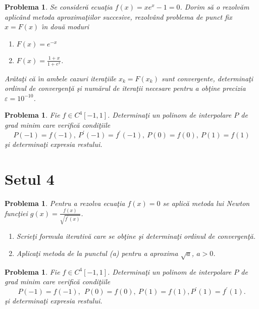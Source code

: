 \documentclass{article}%
\newtheorem{problem}[theorem]{Problema}
\begin{document}
\begin{problem}
Se consider\u{a} ecua\c{t}ia $f(x)=xe^{x}-1=0$. Dorim s\u{a} o rezolv\u{a}m
aplic\^{a}nd metoda aproxima\c{t}iilor succesive, rezolv\^{a}nd problema de
punct fix $x=F(x)$ \^{\i}n dou\u{a} moduri

\begin{enumerate}
\item[(a)] $F(x)=e^{-x}$

\item[(b)] $F(x)=\frac{1+x}{1+e^{x}}$.
\end{enumerate}

Ar\u{a}ta\c{t}i c\u{a} \^{\i}n ambele cazuri itera\c{t}iile $x_{k}=F(x_{k})$
sunt convergente, determina\c{t}i ordinul de convergen\c{t}\u{a} \c{s}i
num\u{a}rul de itera\c{t}ii necesare pentru a ob\c{t}ine precizia
$\varepsilon=10^{-10}$.
\end{problem}

\begin{problem}
Fie $f\in C^{4}[-1,1]$. Determina\c{t}i un polinom de interpolare $P$ de grad
minim care verific\u{a} condi\c{t}iile
\[
P(-1)=f(-1),~P^{\prime}(-1)=f^{\prime}(-1),~P(0)=f(0),~P(1)=f(1)
\]
\c{s}i determina\c{t}i expresia restului.
\end{problem}

\vspace{3cm}

\section*{Setul 4}

\begin{problem}
Pentru a rezolva ecua\c{t}ia $f(x)=0$ se aplic\u{a} metoda lui Newton
func\c{t}iei $g(x)=\frac{f(x)}{\sqrt{f^{\prime}(x)}}$.

\begin{enumerate}
\item[(a)] Scrie\c{t}i formula iterativ\u{a} care se ob\c{t}ine \c{s}i
determina\c{t}i ordinul de convergen\c{t}\u{a}.

\item[(b)] Aplica\c{t}i metoda de la punctul (a) pentru a aproxima $\sqrt{a}$,
$a>0$.
\end{enumerate}
\end{problem}

\begin{problem}
Fie $f\in C^{4}[-1,1]$. Determina\c{t}i un polinom de interpolare $P$ de grad
minim care verific\u{a} condi\c{t}iile
\[
P(-1)=f(-1),~~P(0)=f(0),~P(1)=f(1),P^{\prime}(1)=f^{\prime}(1).
\]
\c{s}i determina\c{t}i expresia restului.
\end{problem}
\end{document}
